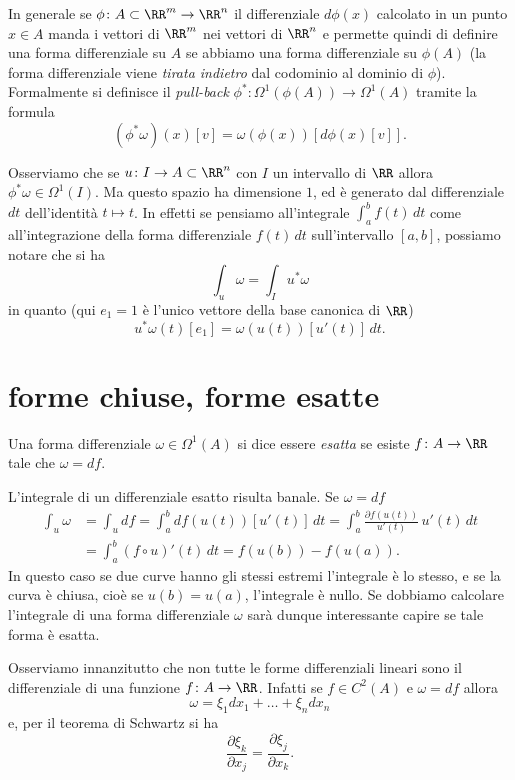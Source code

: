 In generale se $\phi \colon A\subset \RR^m \to \RR^n$ 
il differenziale $d\phi(x)$ calcolato in un punto $x\in A$
manda i vettori di $\RR^m$ nei vettori di $\RR^n$ 
e permette quindi di definire una forma differenziale su $A$
se abbiamo una forma differenziale su $\phi(A)$
(la forma differenziale viene \emph{tirata indietro} dal codominio al dominio di $\phi$).
Formalmente si definisce il \emph{pull-back}
$\phi^*\colon \Omega^1(\phi(A)) \to \Omega^1(A)$ 
tramite la formula
\[
   (\phi^* \omega)(x)[v] = \omega(\phi(x))[d\phi(x)[v]].
\]

Osserviamo che se $u\colon I\to A\subset \RR^n$ 
con $I$ un intervallo di $\RR$ 
allora $\phi^* \omega \in \Omega^1(I)$. 
Ma questo spazio ha dimensione $1$, ed è generato dal differenziale 
$dt$ dell'identità $t\mapsto t$. 
In effetti se pensiamo all'integrale 
$\int_a^b f(t)\, dt$
come all'integrazione della forma differenziale $f(t)\, dt$ 
sull'intervallo $[a,b]$, possiamo notare che si ha
\[
 \int_u \omega = \int_I u^* \omega
\]
in quanto (qui $e_1=1$ è l'unico vettore della base canonica di $\RR$)
\[
  u^* \omega(t)[e_1] = \omega(u(t))[u'(t)]\, dt.
\]

\section{forme chiuse, forme esatte}

\begin{definition}
Una forma differenziale $\omega\in \Omega^1(A)$ si dice essere \emph{esatta}
se esiste $f\colon A\to \RR$ tale che $\omega = df$.
\end{definition}

L'integrale di un differenziale esatto risulta banale. Se $\omega = df$
\begin{align*}    
    \int_u \omega 
    &= \int_u df 
    = \int_a^b df(u(t))[u'(t)]\, dt 
    = \int_a^b \frac{\partial f(u(t))}{u'(t)}\, u'(t) \, dt\\
    &= \int_a^b (f\circ u)'(t) \, dt 
    = f(u(b)) - f(u(a)).
\end{align*}
In questo caso se due curve hanno gli stessi estremi l'integrale è lo stesso,
e se la curva è chiusa, cioè se $u(b) = u(a)$,
l'integrale è nullo. 
Se dobbiamo calcolare l'integrale di una forma differenziale $\omega$ sarà dunque 
interessante capire se tale forma è esatta.

Osserviamo innanzitutto che non tutte le forme differenziali lineari 
sono il differenziale di una funzione $f\colon A\to \RR$.
Infatti se $f\in C^2(A)$ e $\omega = df$
allora 
\[
    \omega = \xi_1 dx_1 + \dots + \xi_n dx_n
\]
e, per il teorema di Schwartz si ha 
\begin{equation}\label{eq:forma-chiusa}
  \frac{\partial \xi_k}{\partial x_j} = \frac{\partial \xi_j}{\partial x_k}.
\end{equation}

